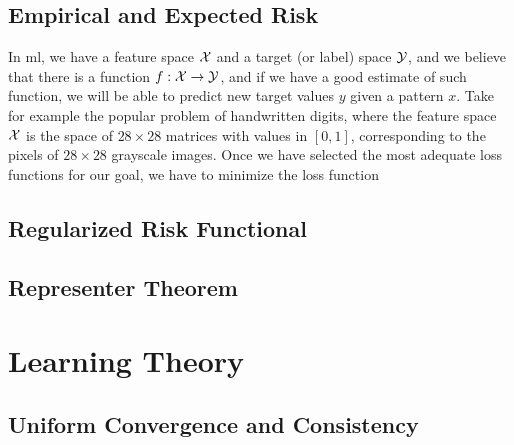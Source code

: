 \subsection{Empirical and Expected Risk} 
In \acrshort{ml}, we have a feature space $\mathcal{X}$ and a target (or label) space $\mathcal{Y}$, and we believe that there is a function $f: \mathcal{X} \to \mathcal{Y}$, and if we have a good estimate of such function, we will be able to predict new target values $y$ given a pattern $x$. Take for example the popular problem  of handwritten digits, where the feature space $\mathcal{X}$ is the space of $28 \times 28$ matrices with values in $[0, 1]$, corresponding to the pixels of $28 \times 28$ grayscale images.
Once we have selected the most adequate loss functions for our goal, we have to minimize the loss function 
%

\subsection{Regularized Risk Functional}


\subsection{Representer Theorem} %

















\section{Learning Theory}
% 
%






\subsection{Uniform Convergence and Consistency}
